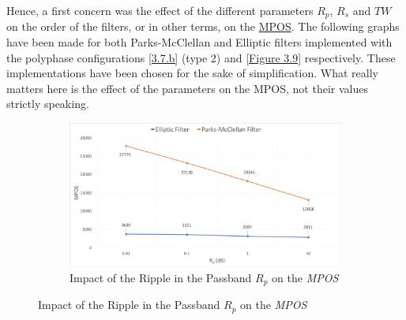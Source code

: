 
Hence, a first concern was the effect of the different parameters $R_p$, $R_s$ and $TW$ on the order of the filters, or in other terms, on the \hyperlink{MPOS}{MPOS}. The following graphs have been made for both Parks-McClellan and Elliptic filters implemented with the polyphase configurations \ref{3.7.b} (type 2) and \ref{Figure 3.9} respectively. These implementations have been chosen for the sake of simplification. What really matters here is the effect of the parameters on the  MPOS, not their values strictly speaking.


\begin{figure}[ht!]
	\centering
	\begin{subfigure}[htb]{\textwidth}
		\centering 
		\includegraphics[scale=0.275]{effect_Rp.png}
		\caption{Impact of the Ripple in the Passband $R_p$ on the \textit{MPOS}}\label{3.21.a}
	\end{subfigure}
\end{figure}

\newpage


